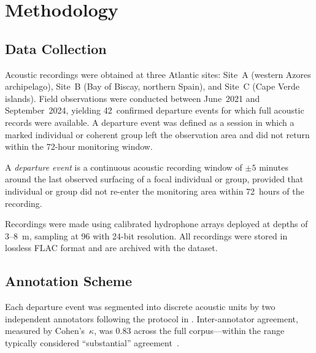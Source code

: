 
\section{Methodology}
\label{sec:methodology}

\subsection{Data Collection}
\label{subsec:data-collection}

Acoustic recordings were obtained at three Atlantic sites:
Site~A (western Azores archipelago), Site~B (Bay of Biscay, northern Spain), and Site~C (Cape Verde islands).
Field observations were conducted between June~2021 and September~2024,
yielding 42~confirmed departure events for which full acoustic records were available.
A departure event was defined as a session in which a marked individual or coherent group
left the observation area and did not return within the 72-hour monitoring window.

\begin{definition}
	\label{def:departure-event}
	A \emph{departure event} is a continuous acoustic recording window of
	\(\pm 5\) minutes around the last observed surfacing of a focal individual or group,
	provided that individual or group did not re-enter the monitoring area within 72~hours of the recording.
\end{definition}

Recordings were made using calibrated hydrophone arrays deployed at depths of 3--8~m, sampling at 96\kHz{} with 24-bit resolution.
All recordings were stored in lossless FLAC format and are archived with the \citet{GuideResearch2025dataset} dataset.

\subsection{Annotation Scheme}
\label{subsec:annotation}

Each departure event was segmented into discrete acoustic units by two independent annotators
following the protocol in \citet{GuideResearch2025dataset}.
Inter-annotator agreement, measured by Cohen's~$\kappa$, was $0.83$ across the full corpus---within
the range typically considered ``substantial'' agreement~\citep{Dent2024farewell}.

